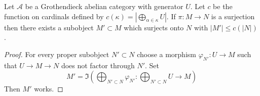 \begin{lemma}
\label{lemma-surjection-bounded-size}
Let $\mathcal{A}$ be a Grothendieck abelian category with generator $U$.
Let $c$ be the function on cardinals defined by
$c(\kappa) = |\bigoplus_{\alpha \in \kappa} U|$. If $\pi : M \to N$ is a
surjection then there exists a subobject $M' \subset M$ which surjects
onto $N$ with $|M'| \leq c(|N|)$.
\end{lemma}

\begin{proof}
For every proper subobject $N' \subset N$ choose a morphism
$\varphi_{N'} : U \to M$ such that $U \to M \to N$ does not factor
through $N'$. Set
$$
M' = \Im\left(
\bigoplus\nolimits_{N' \subset N} \varphi_{N'} :
\bigoplus\nolimits_{N' \subset N} U \longrightarrow M\right)
$$
Then $M'$ works.
\end{proof}
